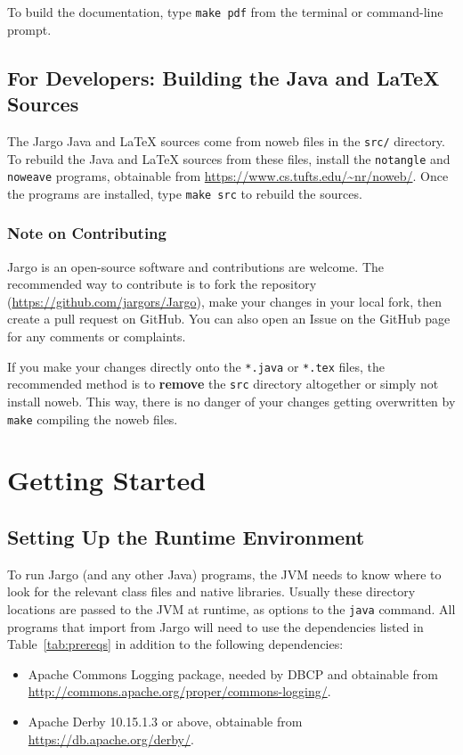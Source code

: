 To build the documentation, type \texttt{make pdf} from the terminal or
command-line prompt.

\section{For Developers: Building the Java and LaTeX Sources}

The Jargo Java and LaTeX sources come from noweb files in the \texttt{src/}
directory. To rebuild the Java and LaTeX sources from these files, install the
\texttt{notangle} and \texttt{noweave} programs, obtainable from
\url{https://www.cs.tufts.edu/~nr/noweb/}. Once the programs are installed,
type \texttt{make src} to rebuild the sources.

\subsection*{Note on Contributing}

Jargo is an open-source software and contributions are welcome. The recommended
way to contribute is to fork the repository
(\url{https://github.com/jargors/Jargo}), make your changes in your local fork,
then create a pull request on GitHub. You can also open an Issue on the GitHub
page for any comments or complaints.

If you make your changes directly onto the \texttt{*.java} or \texttt{*.tex}
files, the recommended method is to \textbf{remove} the \texttt{src} directory
altogether or simply not install noweb. This way, there is no danger of your
changes getting overwritten by \texttt{make} compiling the noweb files.

\nwenddocs{}\chapter{Getting Started}

\section{Setting Up the Runtime Environment}

To run Jargo (and any other Java) programs, the JVM needs to know where to look
for the relevant class files and native libraries. Usually these directory
locations are passed to the JVM at runtime, as options to the \texttt{java}
command. All programs that import from Jargo will need to use the dependencies
listed in Table~\ref{tab:prereqs} in addition to the following dependencies:
\begin{itemize}
\item Apache Commons Logging package, needed by DBCP and obtainable from
\url{http://commons.apache.org/proper/commons-logging/}.
\item Apache Derby 10.15.1.3 or above, obtainable from
\url{https://db.apache.org/derby/}.
\end{itemize}

